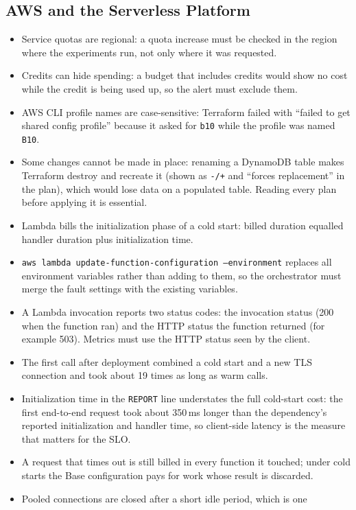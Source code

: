 \documentclass[10pt]{article}
\begin{document}
\subsection{AWS and the Serverless Platform}
\begin{itemize}
  \item Service quotas are regional: a quota increase must be checked in the
  region where the experiments run, not only where it was requested.
  \item Credits can hide spending: a budget that includes credits would show
  no cost while the credit is being used up, so the alert must exclude them.
  \item AWS CLI profile names are case-sensitive: Terraform failed with
  ``failed to get shared config profile'' because it asked for \texttt{b10}
  while the profile was named \texttt{B10}.
  \item Some changes cannot be made in place: renaming a DynamoDB table makes
  Terraform destroy and recreate it (shown as \texttt{-/+} and
  ``forces replacement'' in the plan), which would lose data on a populated
  table. Reading every plan before applying it is essential.
  \item Lambda bills the initialization phase of a cold start: billed duration
  equalled handler duration plus initialization time.
  \item \texttt{aws lambda update-function-configuration --environment}
  replaces all environment variables rather than adding to them, so the
  orchestrator must merge the fault settings with the existing variables.
  \item A Lambda invocation reports two status codes: the invocation status
  (200 when the function ran) and the HTTP status the function returned (for
  example 503). Metrics must use the HTTP status seen by the client.
  \item The first call after deployment combined a cold start and a new TLS
  connection and took about 19 times as long as warm calls.
  \item Initialization time in the \texttt{REPORT} line understates the full
  cold-start cost: the first end-to-end request took about 350\,ms longer than
  the dependency's reported initialization and handler time, so client-side
  latency is the measure that matters for the SLO.
  \item A request that times out is still billed in every function it touched;
  under cold starts the Base configuration pays for work whose result is
  discarded.
  \item Pooled connections are closed after a short idle period, which is one

\end{itemize}
\end{document}

